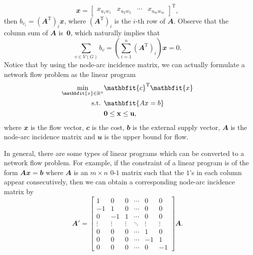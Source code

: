 \documentclass[math, code]{amznotes}
\theoremstyle{remark}
\begin{document}
\begin{equation*}
    \mathbfit{x} = \begin{bmatrix}
        x_{u_1w_1} & x_{u_2w_2} & \cdots & x_{u_mw_m}
    \end{bmatrix}^{\mathrm{T}},
\end{equation*}
then $b_{v_i} = \left(\mathbfit{A}^{\mathrm{T}}\right)_{i}\mathbfit{x}$, where $\left(\mathbfit{A}^{\mathrm{T}}\right)_{i}$ is the $i$-th row of $\mathbfit{A}$. Observe that the column sum of $\mathbfit{A}$ is~$\mathbf{0}$, which naturally implies that 
\begin{equation*}
    \sum_{v \in V(G)}b_v = \left(\sum_{i = 1}^n\left(\mathbfit{A}^{\mathrm{T}}\right)_{i}\right)\mathbfit{x} = 0.
\end{equation*}
Notice that by using the node-arc incidence matrix, we can actually formulate a network flow problem as the linear program 
\begin{align*}
    \min_{\mathbfit{x} \in \R^n} & \mathbfit{c}^{\mathrm{T}}\mathbfit{x} \\
    \textrm{s.t. } & \mathbfit{Ax = b} \\
    & \mathbf{0 \leq x \leq u},
\end{align*}
where $\mathbfit{x}$ is the flow vector, $\mathbfit{c}$ is the cost, $\mathbfit{b}$ is the external supply vector, $\mathbfit{A}$ is the node-arc incidence matrix and $\mathbfit{u}$ is the upper bound for flow.

In general, there are some types of linear programs which can be converted to a network flow problem. For example, if the constraint of a linear program is of the form $\mathbfit{Ax = b}$ where $\mathbfit{A}$ is an $m \times n$ $0$-$1$ matrix such that the $1$'s in each column appear consecutively, then we can obtain a corresponding node-arc incidence matrix by 
\begin{equation*}
    \mathbfit{A}' = \begin{bmatrix}
        1 & 0 & 0 & \cdots & 0 & 0 \\
        -1 & 1 & 0 & \cdots & 0 & 0 \\
        0 & -1 & 1 & \cdots & 0 & 0 \\
        \vdots & \vdots & \vdots & \ddots & \vdots & \vdots \\
        0 & 0 & 0 & \cdots & 1 & 0 \\
        0 & 0 & 0 & \cdots & - 1 & 1 \\
        0 & 0 & 0 & \cdots & 0 & -1
    \end{bmatrix}\mathbfit{A}.
\end{equation*}
\end{document}
